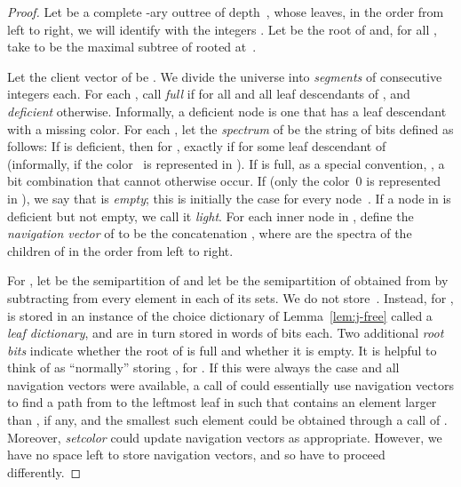 \documentclass[envcountsame,envcountsect,undated,nolinenumbers]{lnthi}
\def\Tvn#1{\hbox{\textit{#1\/}}}
\begin{document}
\begin{proof}
Let  be a complete -ary outtree of
depth~, whose leaves, in the order from
left to right, we will identify with
the integers .
Let  be the root of  and, for all ,
take  to be the maximal subtree of 
rooted at~.

Let the client vector of  be
.
We divide the universe
 into 
\emph{segments} 
 of  consecutive integers each.
For each , call  \emph{full}
if  for all
 and all leaf
descendants  of , and
\emph{deficient} otherwise.
Informally, a deficient node is one that has a
leaf descendant with a missing color.
For each , let the \emph{spectrum} of 
be the string  of 
bits defined as follows:
If  is deficient,
then for , 
exactly if 
for some leaf descendant  of~
(informally, if the color~ is represented in ).
If  is full, as a special convention,
, a
bit combination that cannot otherwise occur.
If 
(only the color~0 is represented in ),
we say that  is \emph{empty};
this is initially the case for every node~.
If a node in  is deficient but not empty,
we call it \emph{light}.
For each inner node  in , define the
\emph{navigation vector} of  to be the concatenation
, where  are the
spectra of the  children of  in the
order from left to right.

For , let 
be the semipartition
 of 
and let  be the semipartition
of  obtained from 
by subtracting  from every element
in each of its sets.
We do not store~.
Instead, for , 
is stored in an instance  of the
choice dictionary of Lemma~\ref{lem:j-free}
called a \emph{leaf dictionary},
and  are in turn stored
in  words  of  bits each.
Two additional \emph{root bits} indicate whether the root 
of  is full and whether it is empty.
It is helpful to think of  as ``normally''
storing ,
for .
If this were always the case and all navigation vectors
were available, a call of 
could essentially use navigation vectors to find
a path from  to the leftmost leaf  in 
such that  contains an 
element larger than , if any,
and the smallest such element
could be obtained through a call of
.
Moreover, \Tvn{setcolor}
could update navigation vectors as appropriate.
However, we have no space left to store
navigation vectors, and so have to proceed differently.


\end{proof}
\end{document}
